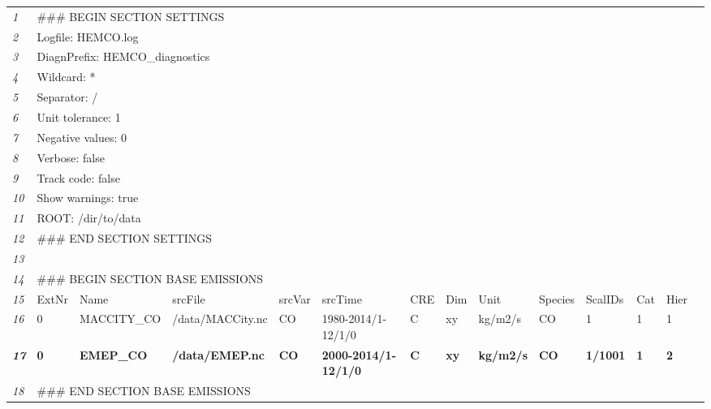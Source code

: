 \documentclass[12pt,a4paper]{article} %
\begin{document}
\hspace*{-1cm}
\ifdefined\HCode
   \begin{small}
\else
   \begin{scriptsize}
\fi
   \begin{tabular}{l|lllllllllllll} \hline
    \textit{1} & \multicolumn{3}{l}{\#\#\# BEGIN SECTION SETTINGS} & & & & & & & & & & \\
    \textit{2} & \multicolumn{3}{l}{Logfile: HEMCO.log} & & & & & & & & & & \\
    \textit{3} & \multicolumn{3}{l}{DiagnPrefix: HEMCO\_diagnostics} & & & & & & & & & & \\
    \textit{4} & \multicolumn{3}{l}{Wildcard: *} & & & & & & & & & & \\
    \textit{5} & \multicolumn{3}{l}{Separator: /} & & & & & & & & & & \\
    \textit{6} & \multicolumn{3}{l}{Unit tolerance: 1} & & & & & & & & & & \\
    \textit{7} & \multicolumn{3}{l}{Negative values: 0} & & & & & & & & & & \\
    \textit{8} & \multicolumn{3}{l}{Verbose: false} & & & & & & & & & & \\
    \textit{9} & \multicolumn{3}{l}{Track code: false} & & & & & & & & & & \\
    \textit{10} & \multicolumn{3}{l}{Show warnings: true} & & & & & & & & & & \\
    \textit{11} & \multicolumn{3}{l}{ROOT: /dir/to/data} & & & & & & & & & & \\
    \textit{12} & \multicolumn{3}{l}{\#\#\# END SECTION SETTINGS} & & & & & & & & & & \\  
    \textit{13} & & & & & & & & & & & & & \\
    \textit{14} & \multicolumn{3}{l}{\#\#\# BEGIN SECTION BASE EMISSIONS} & & & & & & & & & & \\
    \textit{15} & ExtNr & Name & srcFile & srcVar & srcTime & CRE & Dim & Unit & Species & ScalIDs & Cat & Hier \\
    \textit{16} & 0 & MACCITY\_CO & /data/MACCity.nc & CO & 1980-2014/1-12/1/0 & C & xy & kg/m2/s & CO & 1 & 1 & 1 \\
    \textit{\textbf{17}} & \textbf{0} & \textbf{EMEP\_CO} & \textbf{/data/EMEP.nc} & \textbf{CO} & \textbf{2000-2014/1-12/1/0} & \textbf{C} & \textbf{xy} & \textbf{kg/m2/s} & \textbf{CO} & \textbf{1/1001} & \textbf{1} & \textbf{2} \\
    \textit{18} & \multicolumn{3}{l}{\#\#\# END SECTION BASE EMISSIONS} & & & & & & & & & & \\  

\end{tabular}
\end{scriptsize}
\end{small}
\end{document}

